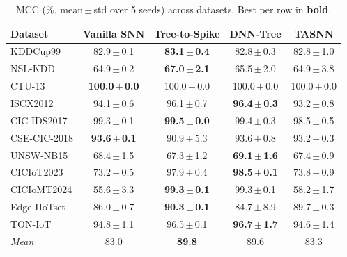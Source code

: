 \begin{table}[t]
\centering
\caption{MCC (\%, mean\,$\pm$\,std over 5 seeds) across datasets. Best per row in \textbf{bold}.}
\label{tab:mcc}
\footnotesize
\setlength{\tabcolsep}{4pt}
\begin{tabular}{lcccc}
\toprule
Dataset & Vanilla SNN & Tree-to-Spike & DNN-Tree & TASNN \\
\midrule
KDDCup99 & 82.9\,$\pm$\,0.1 & \textbf{83.1\,$\pm$\,0.4} & 82.8\,$\pm$\,0.3 & 82.8\,$\pm$\,1.0 \\
NSL-KDD & 64.9\,$\pm$\,0.2 & \textbf{67.0\,$\pm$\,2.1} & 65.5\,$\pm$\,2.0 & 64.9\,$\pm$\,3.8 \\
CTU-13 & \textbf{100.0\,$\pm$\,0.0} & 100.0\,$\pm$\,0.0 & 100.0\,$\pm$\,0.0 & 100.0\,$\pm$\,0.0 \\
ISCX2012 & 94.1\,$\pm$\,0.6 & 96.1\,$\pm$\,0.7 & \textbf{96.4\,$\pm$\,0.3} & 93.2\,$\pm$\,0.8 \\
CIC-IDS2017 & 99.3\,$\pm$\,0.1 & \textbf{99.5\,$\pm$\,0.0} & 99.4\,$\pm$\,0.3 & 98.5\,$\pm$\,0.5 \\
CSE-CIC-2018 & \textbf{93.6\,$\pm$\,0.1} & 90.9\,$\pm$\,5.3 & 93.6\,$\pm$\,0.8 & 93.2\,$\pm$\,0.3 \\
UNSW-NB15 & 68.4\,$\pm$\,1.5 & 67.3\,$\pm$\,1.2 & \textbf{69.1\,$\pm$\,1.6} & 67.4\,$\pm$\,0.9 \\
CICIoT2023 & 73.2\,$\pm$\,0.5 & 97.9\,$\pm$\,0.4 & \textbf{98.5\,$\pm$\,0.1} & 73.8\,$\pm$\,0.9 \\
CICIoMT2024 & 55.6\,$\pm$\,3.3 & \textbf{99.3\,$\pm$\,0.1} & 99.3\,$\pm$\,0.1 & 58.2\,$\pm$\,1.7 \\
Edge-IIoTset & 86.0\,$\pm$\,0.7 & \textbf{90.3\,$\pm$\,0.1} & 84.7\,$\pm$\,8.9 & 89.7\,$\pm$\,0.3 \\
TON-IoT & 94.8\,$\pm$\,1.1 & 96.5\,$\pm$\,0.1 & \textbf{96.7\,$\pm$\,1.7} & 94.6\,$\pm$\,1.4 \\
\midrule
\textit{Mean} & 83.0 & \textbf{89.8} & 89.6 & 83.3 \\
\bottomrule
\end{tabular}
\end{table}
